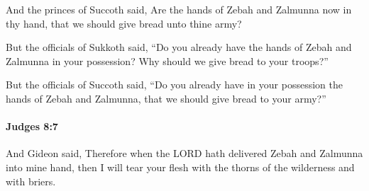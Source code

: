 			\begin{versebox}
					\item[BHS] 
					\item[ASV] And the princes of Succoth said, Are the hands of Zebah and Zalmunna now in thy hand, that we should give bread unto thine army?
					\item[NIV] But the officials of Sukkoth said, “Do you already have the hands of Zebah and Zalmunna in your possession? Why should we give bread to your troops?”
					\item[NRSV] But the officials of Succoth said, “Do you already have in your possession the hands of Zebah and Zalmunna, that we should give bread to your army?”
			\end{versebox}

		\paragraph{Judges 8:7} %
			\label{JUDGES-8-7}

			And Gideon said, Therefore when the LORD hath delivered Zebah and Zalmunna into mine hand, then I will tear your flesh with the thorns of the wilderness and with briers.

